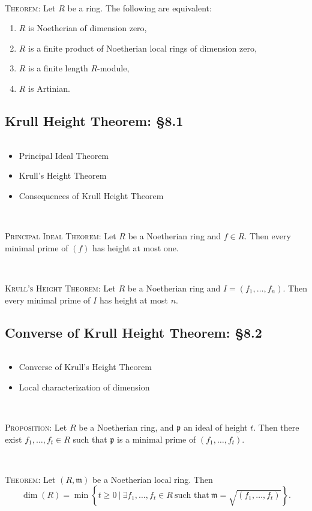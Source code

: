 \documentclass[12pt]{amsart}
\newcommand{\m}{\mathfrak{m}}
\newcommand{\p}{\mathfrak{p}}
\newcommand{\0}{$\phantom{.}$}
\newcommand{\1}{\mathbbm{1}}
\begin{document}
\
	
		\noindent	\textsc{Theorem:} Let $R$ be a ring. The following are equivalent:
		\begin{enumerate}
		\item $R$ is Noetherian of dimension zero,
		\item $R$ is a finite product of Noetherian local rings of dimension zero,
		\item $R$ is a finite length $R$-module,
		\item $R$ is Artinian.
		\end{enumerate}
		
		
		\newpage
	
	\subsection{Krull Height Theorem: \S8.1}  \0

\begin{framed}
\begin{itemize}
\item Principal Ideal Theorem
\item Krull's Height Theorem
\item Consequences of Krull Height Theorem
\end{itemize}
\end{framed}

\


	\noindent	 \textsc{Principal Ideal Theorem:} 	Let $R$ be a Noetherian ring and $f\in R$. Then every minimal prime of $(f)$ has height at most one.
	
	\
	
		\noindent	 \textsc{Krull's Height Theorem:}  Let $R$ be a Noetherian ring and $I=(f_1,\dots,f_n)$. Then every minimal prime of $I$ has height at most $n$.



		\newpage
	
	\subsection{Converse of Krull Height Theorem: \S8.2}  \0

\begin{framed}
\begin{itemize}
\item Converse of Krull's Height Theorem
\item Local characterization of dimension
\end{itemize}
\end{framed}

\


	\noindent	 \textsc{Proposition:} Let $R$ be a Noetherian ring, and $\p$ an ideal of height $t$. Then there exist $f_1,\dots,f_t\in R$ such that $\p$ is a minimal prime of $(f_1,\dots,f_t)$.
	
	\
	
		\noindent	 \textsc{Theorem:}  Let $(R,\m)$ be a Noetherian local ring. Then 
		\[ \dim(R) = \min\left\{ t\geq 0 \ \big| \ \exists f_1,\dots,f_t\in R \ \text{such that} \ \m = \sqrt{(f_1,\dots,f_t)}\right\}.\]


\begin{comment}


\end{comment}
\end{document}

